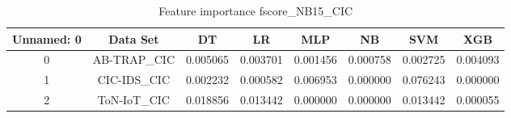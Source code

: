 \begin{table}[H]
\centering
\caption{Feature importance fscore_NB15_CIC}
\label{fscore_NB15_CIC}
\begin{tabular}{cccccccc}
\toprule
 Unnamed: 0 &    Data Set &       DT &       LR &      MLP &       NB &      SVM &      XGB \\
\midrule
          0 & AB-TRAP\_CIC & 0.005065 & 0.003701 & 0.001456 & 0.000758 & 0.002725 & 0.004093 \\
          1 & CIC-IDS\_CIC & 0.002232 & 0.000582 & 0.006953 & 0.000000 & 0.076243 & 0.000000 \\
          2 & ToN-IoT\_CIC & 0.018856 & 0.013442 & 0.000000 & 0.000000 & 0.013442 & 0.000055 \\
\bottomrule
\end{tabular}
\end{table}

